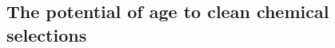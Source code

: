 \documentclass[fleqn,usenatbib]{mnras}
\begin{document}







\subsection{The potential of age to clean chemical selections}
\end{document}
